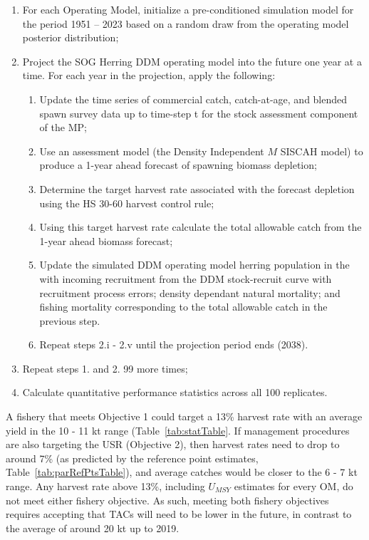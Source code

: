 \documentclass[11pt]{book}
\begin{document}
\begin{enumerate}
\def\labelenumi{\arabic{enumi}.}
\item
  For each Operating Model, initialize a pre-conditioned simulation model for the period 1951 -- 2023 based on a random draw from the operating model posterior distribution;
\item
  Project the SOG Herring DDM operating model into the future one year at a time. For each year in the projection, apply the following:
  \begin{enumerate}
  \def\labelenumii{\roman{enumii})}

  \item
    Update the time series of commercial catch, catch-at-age, and blended spawn survey data up to time-step t for the stock assessment component of the MP;
  \item
    Use an assessment model (the Density Independent \(M\) SISCAH model) to produce a 1-year ahead forecast of spawning biomass depletion;
  \item
    Determine the target harvest rate associated with the forecast depletion using the HS 30-60 harvest control rule;
  \item
    Using this target harvest rate calculate the total allowable catch from the 1-year ahead biomass forecast;
  \item
    Update the simulated DDM operating model herring population in the with incoming recruitment from the DDM stock-recruit curve with recruitment process errors; density dependant natural mortality; and fishing mortality corresponding to the total allowable catch in the previous step.
  \item
    Repeat steps 2.i - 2.v until the projection period ends (2038).
  \end{enumerate}
\item
  Repeat steps 1. and 2. 99 more times;
\item
  Calculate quantitative performance statistics across all 100 replicates.
\end{enumerate}

\clearpage

\hypertarget{discussion}{%
\label{discussion}}

A fishery that meets Objective 1 could target a 13\% harvest rate with an average yield in the 10 - 11 kt range (Table~\ref{tab:statTable}. If management procedures are also targeting the USR (Objective 2), then harvest rates need to drop to around 7\% (as predicted by the reference point estimates, Table~\ref{tab:parRefPtsTable}), and average catches would be closer to the 6 - 7 kt range. Any harvest rate above 13\%, including \(U_{MSY}\) estimates for every OM, do not meet either fishery objective. As such, meeting both fishery objectives requires accepting that TACs will need to be lower in the future, in contrast to the average of around 20 kt up to 2019.
\end{document}
